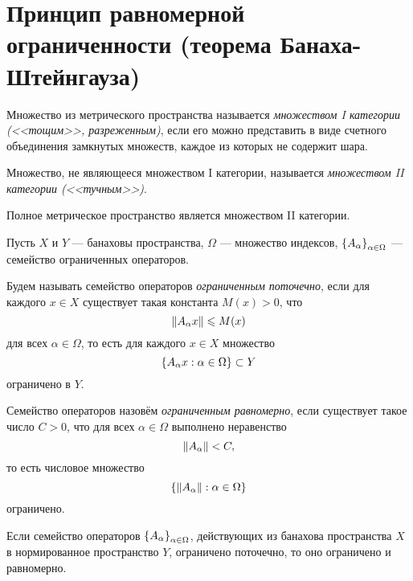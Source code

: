 \section[Принцип равномерной ограниченности]{Принцип равномерной ограниченности
(теорема Банаха-Штейнгауза)}

\begin{definition}
    Множество из метрического пространства называется \emph{множеством I
    категории
    (<<тощим>>, разреженным)}, если его можно представить в виде счетного объединения замкнутых
    множеств, каждое из которых не содержит шара.
\end{definition}

\begin{definition}
    Множество, не являющееся множеством I категории, называется \emph{множеством
    II категории (<<тучным>>)}.
\end{definition}

\begin{theorem}[Бэра]
    Полное метрическое пространство является множеством II категории.
\end{theorem}

Пусть $X$ и $Y$ --- банаховы пространства, $\Omega$ --- множество индексов,
$\left\{A_\alpha\right\}_{\alpha \in \Omega}$ --- семейство ограниченных операторов.

Будем называть семейство операторов \emph{ограниченным поточечно}, если для
каждого $x \in X$ существует такая константа $M(x) > 0$, что
\[ \left\|A_\alpha x\right\| \leqslant M(x) \]
для всех $\alpha \in \Omega$, то есть для каждого $x \in X$ множество
\[ \left\{A_\alpha x : \alpha \in \Omega\right\} \subset Y \]
ограничено в $Y$.

Семейство операторов назовём \emph{ограниченным равномерно}, если существует такое
число $C > 0$, что для всех $\alpha \in \Omega$ выполнено неравенство
\[ \left\|A_\alpha\right\| < C, \]
то есть числовое множество
\[ \left\{\left\|A_\alpha\right\| : \alpha \in \Omega\right\} \]
ограничено.

\begin{theorem}
    Если семейство операторов $\left\{A_\alpha\right\}_{\alpha \in \Omega}$,
    действующих из банахова пространства $X$ в нормированное пространство $Y$, 
    ограничено поточечно, то оно ограничено и равномерно. 
\end{theorem}

